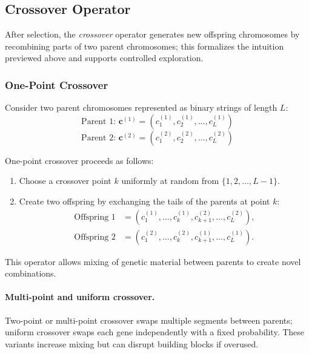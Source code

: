 \subsection{Crossover Operator}
\label{sec:evo_crossover_operator}

After selection, the \emph{crossover} operator generates new offspring chromosomes by recombining parts of two parent chromosomes; this formalizes the intuition previewed above and supports controlled exploration.

\subsubsection{One-Point Crossover}
\label{sec:evo_one_point_crossover_sub}

Consider two parent chromosomes represented as binary strings of length $L$:
\[
\text{Parent 1: } \mathbf{c}^{(1)} = (c^{(1)}_1, c^{(1)}_2, \ldots, c^{(1)}_L)
\]
\[
\text{Parent 2: } \mathbf{c}^{(2)} = (c^{(2)}_1, c^{(2)}_2, \ldots, c^{(2)}_L)
\]

One-point crossover proceeds as follows:

\begin{enumerate}
    \item Choose a crossover point $k$ uniformly at random from $\{1, 2, \ldots, L-1\}$.
    \item Create two offspring by exchanging the tails of the parents at point $k$:
    \begin{equation}
    \begin{aligned}
        \text{Offspring 1} &= (c^{(1)}_1, \ldots, c^{(1)}_k, c^{(2)}_{k+1}, \ldots, c^{(2)}_L), \\
        \text{Offspring 2} &= (c^{(2)}_1, \ldots, c^{(2)}_k, c^{(1)}_{k+1}, \ldots, c^{(1)}_L).
    \end{aligned}
    \label{eq:ga_one_point_crossover}
    \end{equation}
\end{enumerate}

This operator allows mixing of genetic material between parents to create novel combinations.

\paragraph{Multi-point and uniform crossover.}
Two-point or multi-point crossover swaps multiple segments between parents; uniform crossover swaps each gene independently with a fixed probability. These variants increase mixing but can disrupt building blocks if overused.

